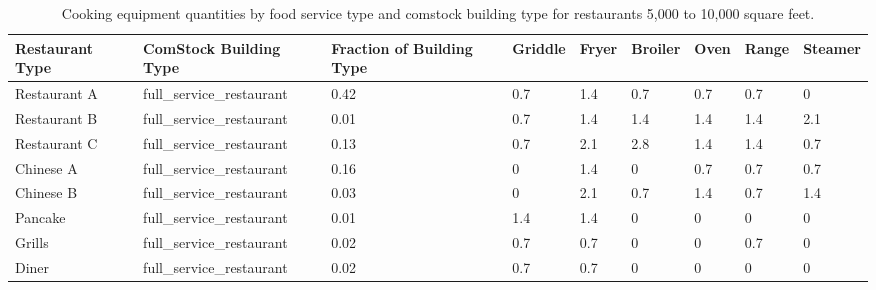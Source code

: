 \begin{table}[]
    \small
    \centering
    \caption[Cooking equipment quantities by food service type and comstock building type for restaurants 5,000 to 10,000 square feet]{Cooking equipment quantities by food service type and comstock building type for restaurants 5,000 to 10,000 square feet.}
    \label{tab:kitchen_cook_counts_res_5to10k}
    \begin{tabular}{|l|l|l|l|l|l|l|l|l|}
    \hline
    \textbf{Restaurant Type} & \textbf{ComStock Building Type} & \textbf{Fraction of Building Type} & \textbf{Griddle} & \textbf{Fryer} & \textbf{Broiler} & \textbf{Oven} & \textbf{Range} & \textbf{Steamer} \\ \hline
    Restaurant A             & full\_service\_restaurant       & 0.42                               & 0.7              & 1.4            & 0.7              & 0.7           & 0.7            & 0                \\ \hline
    Restaurant B             & full\_service\_restaurant       & 0.01                               & 0.7              & 1.4            & 1.4              & 1.4           & 1.4            & 2.1              \\ \hline
    Restaurant C             & full\_service\_restaurant       & 0.13                               & 0.7              & 2.1            & 2.8              & 1.4           & 1.4            & 0.7              \\ \hline
    Chinese A                & full\_service\_restaurant       & 0.16                               & 0                & 1.4            & 0                & 0.7           & 0.7            & 0.7              \\ \hline
    Chinese B                & full\_service\_restaurant       & 0.03                               & 0                & 2.1            & 0.7              & 1.4           & 0.7            & 1.4              \\ \hline
    Pancake                  & full\_service\_restaurant       & 0.01                               & 1.4              & 1.4            & 0                & 0             & 0              & 0                \\ \hline
    Grills                   & full\_service\_restaurant       & 0.02                               & 0.7              & 0.7            & 0                & 0             & 0.7            & 0                \\ \hline
    Diner                    & full\_service\_restaurant       & 0.02                               & 0.7              & 0.7            & 0                & 0             & 0              & 0                \\ \hline

\end{tabular}
\end{table}
